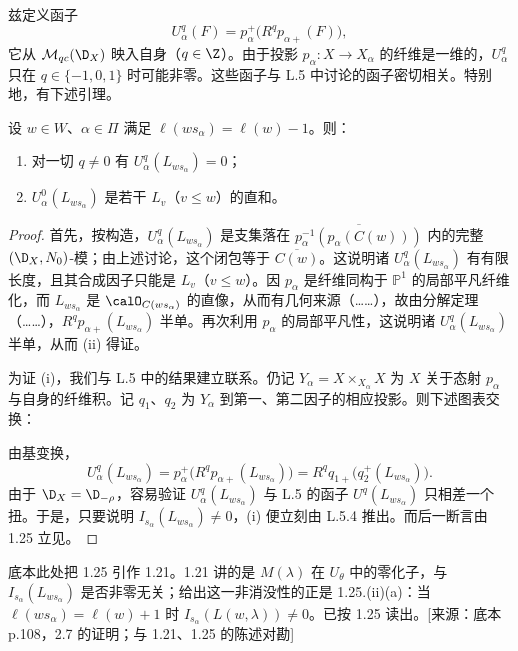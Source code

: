 兹定义函子
$$U^q_\alpha(F)=p_\alpha^+\bigl(R^qp_{\alpha+}(F)\bigr),$$
它从 $\mathcal{M}_{qc}(\D_X)$ 映入自身（$q\in\Z$）。由于投影 $p_\alpha:X\to X_\alpha$ 的纤维是一维的，$U^q_\alpha$ 只在 $q\in\{-1,0,1\}$ 时可能非零。这些函子与 L.5 中讨论的函子密切相关。特别地，有下述引理。

\begin{lemma}\label{lem:05.2.7}
设 $w\in W$、$\alpha\in\Pi$ 满足 $\ell(ws_\alpha)=\ell(w)-1$。则：
\begin{enumerate}[label=(\roman*)]
\item 对一切 $q\neq 0$ 有 $U^q_\alpha(L_{ws_\alpha})=0$；
\item $U^0_\alpha(L_{ws_\alpha})$ 是若干 $L_v$（$v\leq w$）的直和。
\end{enumerate}
\end{lemma}

\begin{proof}
首先，按构造，$U^q_\alpha(L_{ws_\alpha})$ 是支集落在 $\overline{p_\alpha^{-1}(p_\alpha(C(w)))}$ 内的完整 $(\D_X,N_0)$-模；由上述讨论，这个闭包等于 $\overline{C(w)}$。这说明诸 $U^q_\alpha(L_{ws_\alpha})$ 有有限长度，且其合成因子只能是 $L_v$（$v\leq w$）。因 $p_\alpha$ 是纤维同构于 $\mathbb{P}^1$ 的局部平凡纤维化，而 $L_{ws_\alpha}$ 是 $\calO_{C(ws_\alpha)}$ 的直像，从而有几何来源（……），故由分解定理（……），$R^qp_{\alpha+}(L_{ws_\alpha})$ 半单。再次利用 $p_\alpha$ 的局部平凡性，这说明诸 $U^q_\alpha(L_{ws_\alpha})$ 半单，从而 (ii) 得证。

为证 (i)，我们与 L.5 中的结果建立联系。仍记 $Y_\alpha=X\times_{X_\alpha}X$ 为 $X$ 关于态射 $p_\alpha$ 与自身的纤维积。记 $q_1$、$q_2$ 为 $Y_\alpha$ 到第一、第二因子的相应投影。则下述图表交换：
\begin{center}
\end{center}
由基变换，
$$U^q_\alpha(L_{ws_\alpha})=p_\alpha^+\bigl(R^qp_{\alpha+}(L_{ws_\alpha})\bigr)
=R^qq_{1+}\bigl(q_2^+(L_{ws_\alpha})\bigr).$$
由于 $\D_X=\D_{-\rho}$，容易验证 $U^q_\alpha(L_{ws_\alpha})$ 与 L.5 的函子 $U^q(L_{ws_\alpha})$ 只相差一个扭。于是，只要说明 $I_{s_\alpha}(L_{ws_\alpha})\neq 0$，(i) 便立刻由 L.5.4 推出。而后一断言由 1.25 立见。
\end{proof}

\begin{annote}
底本此处把 1.25 引作 1.21。1.21 讲的是 $M(\lambda)$ 在 $U_\theta$ 中的零化子，与 $I_{s_\alpha}(L_{ws_\alpha})$ 是否非零无关；给出这一非消没性的正是 1.25.(ii)(a)：当 $\ell(ws_\alpha)=\ell(w)+1$ 时 $I_{s_\alpha}(L(w,\lambda))\neq 0$。已按 1.25 读出。[来源：底本 p.108，2.7 的证明；与 1.21、1.25 的陈述对勘]
\end{annote}

